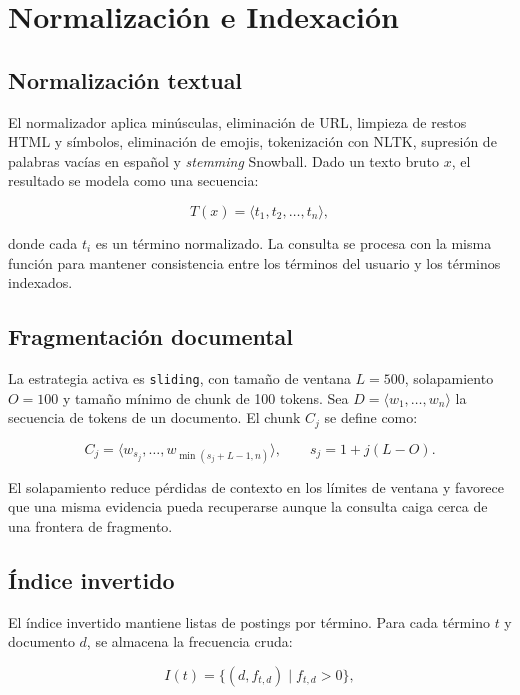 \documentclass[a4paper]{llncs}
\begin{document}
\section{Normalización e Indexación}

\subsection{Normalización textual}

El normalizador aplica minúsculas, eliminación de URL, limpieza de restos HTML y símbolos, eliminación de emojis, tokenización con NLTK, supresión de palabras vacías en español y \textit{stemming} Snowball. Dado un texto bruto $x$, el resultado se modela como una secuencia:

\begin{equation}
T(x)=\langle t_1,t_2,\ldots,t_n\rangle,
\end{equation}

donde cada $t_i$ es un término normalizado. La consulta se procesa con la misma función para mantener consistencia entre los términos del usuario y los términos indexados.

\subsection{Fragmentación documental}

La estrategia activa es \texttt{sliding}, con tamaño de ventana $L=500$, solapamiento $O=100$ y tamaño mínimo de chunk de 100 tokens. Sea $D=\langle w_1,\ldots,w_n\rangle$ la secuencia de tokens de un documento. El chunk $C_j$ se define como:

\begin{equation}
C_j = \langle w_{s_j}, \ldots, w_{\min(s_j+L-1,n)}\rangle,\qquad
s_j = 1 + j(L-O).
\end{equation}

El solapamiento reduce pérdidas de contexto en los límites de ventana y favorece que una misma evidencia pueda recuperarse aunque la consulta caiga cerca de una frontera de fragmento.

\subsection{Índice invertido}

El índice invertido mantiene listas de postings por término. Para cada término $t$ y documento $d$, se almacena la frecuencia cruda:

\begin{equation}
I(t)=\{(d, f_{t,d}) \mid f_{t,d}>0\},
\end{equation}
\end{document}

